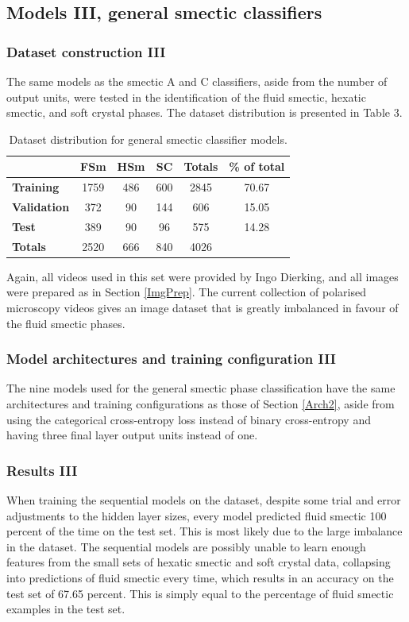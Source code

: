 \documentclass[12pt]{article}
\begin{document}
\subsection{Models III, general smectic classifiers}
\subsubsection{Dataset construction III}
The same models as the smectic A and C classifiers, aside from the number of output units, were tested in the identification of the fluid smectic, hexatic smectic, and soft crystal phases. The dataset distribution is presented in Table 3.
\begin{table}[!htb]
\begin{center}
\caption{Dataset distribution for general smectic classifier models.}
\begin{tabular}{l|c|c|c|c|c}
\toprule
& \textbf{FSm} & \textbf{HSm} & \textbf{SC} & \textbf{Totals} & \textbf{\% of total}\\
\midrule
\textbf{Training} & 1759 & 486 & 600 & 2845 & 70.67\\
\textbf{Validation} & 372 & 90 & 144 & 606 & 15.05\\
\textbf{Test} & 389 & 90 & 96 & 575 & 14.28\\
\midrule
\textbf{Totals} & 2520 & 666 & 840 & 4026\\
\bottomrule
\end{tabular}
\end{center}
\end{table}
Again, all videos used in this set were provided by Ingo Dierking, and all images were prepared as in Section \ref{ImgPrep}. The current collection of polarised microscopy videos gives an image dataset that is greatly imbalanced in favour of the fluid smectic phases. 
\subsubsection{Model architectures and training configuration III}
The nine models used for the general smectic phase classification have the same architectures and training configurations as those of Section \ref{Arch2}, aside from using the categorical cross-entropy loss instead of binary cross-entropy and having three final layer output units instead of one. 
\subsubsection{Results III}
When training the sequential models on the dataset, despite some trial and error adjustments to the hidden layer sizes, every model predicted fluid smectic 100 percent of the time on the test set. This is most likely due to the large imbalance in the dataset. The sequential models are possibly unable to learn enough features from the small sets of hexatic smectic and soft crystal data, collapsing into predictions of fluid smectic every time, which results in an accuracy on the test set of 67.65 percent. This is simply equal to the percentage of fluid smectic examples in the test set.
\end{document}
